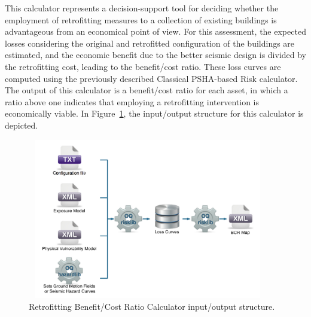 This calculator represents a decision-support tool for deciding whether the employment of retrofitting measures to a collection of existing buildings is advantageous from an economical point of view. For this assessment, the expected losses considering the original and retrofitted configuration of the buildings are estimated, and the economic benefit due to the better seismic design is divided by the retrofitting cost, leading to the benefit/cost ratio. These loss curves are computed using the previously described  Classical PSHA-based Risk calculator. The output of this calculator is a benefit/cost ratio for each asset, in which a ratio above one indicates that employing  a retrofitting intervention is economically viable. In Figure~\ref{fig:BCR}, the input/output structure for this calculator is depicted.

\begin{figure}[ht]
\centering
\includegraphics[width=10.5cm,height=7cm]{figures/risk/BCR.pdf}
\caption{Retrofitting Benefit/Cost Ratio Calculator input/output structure.}
\label{fig:BCR}
\end{figure}